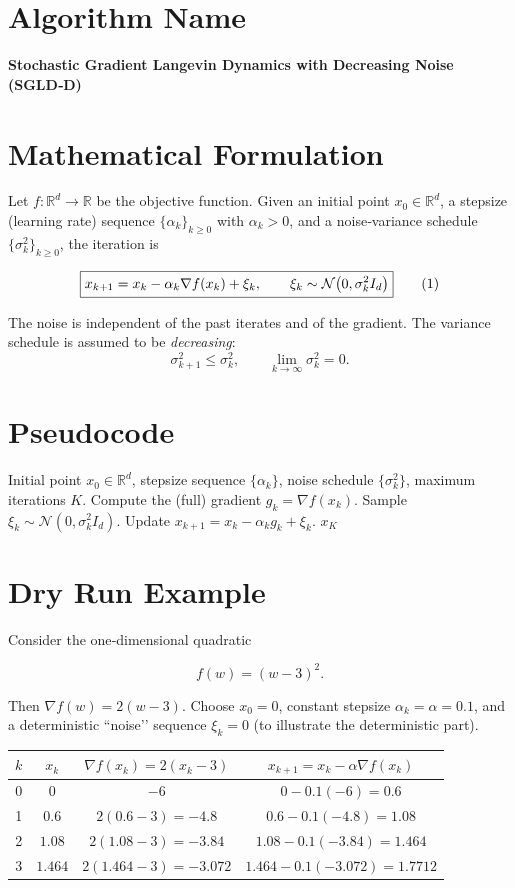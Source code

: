 \documentclass{article}
\newcommand{\R}{\mathbb{R}}
\begin{document}
\section*{Algorithm Name}
\textbf{Stochastic Gradient Langevin Dynamics with Decreasing Noise (SGLD‑D)}  

\section*{Mathematical Formulation}
Let $f:\R^d\rightarrow\R$ be the objective function.  
Given an initial point $x_0\in\R^d$, a stepsize (learning rate) sequence $\{\alpha_k\}_{k\ge0}$ with $\alpha_k>0$, and a noise‑variance schedule $\{\sigma_k^2\}_{k\ge0}$, the iteration is  

\[
\boxed{%
x_{k+1}=x_k-\alpha_k \nabla f(x_k)+\xi_k, \qquad 
\xi_k\sim\mathcal N\bigl(0,\sigma_k^{2} I_d\bigr)
}
\tag{1}
\]

The noise is independent of the past iterates and of the gradient.  
The variance schedule is assumed to be \emph{decreasing}:
\[
\sigma_{k+1}^2\le\sigma_k^2,\qquad \lim_{k\to\infty}\sigma_k^2=0.
\tag{2}
\]

\section*{Pseudocode}
\begin{algorithm}[H]
\caption{SGLD‑D}
\begin{algorithmic}[1]
\REQUIRE Initial point $x_0\in\R^d$, stepsize sequence $\{\alpha_k\}$, noise schedule $\{\sigma_k^2\}$, maximum iterations $K$.
    \STATE Compute the (full) gradient $g_k=\nabla f(x_k)$.
    \STATE Sample $\xi_k\sim\mathcal N(0,\sigma_k^2 I_d)$.
    \STATE Update $x_{k+1}=x_k-\alpha_k g_k+\xi_k$.
\ENDFOR
\RETURN $x_K$
\end{algorithmic}
\end{algorithm}

\section*{Dry Run Example}
Consider the one‑dimensional quadratic  

\[
f(w)=(w-3)^2 .
\]

Then $\nabla f(w)=2(w-3)$.  
Choose $x_0=0$, constant stepsize $\alpha_k=\alpha=0.1$, and a deterministic “noise’’ sequence $\xi_k=0$ (to illustrate the deterministic part).  

\begin{center}
\begin{tabular}{c|c|c|c}
$k$ & $x_k$ & $\nabla f(x_k)=2(x_k-3)$ & $x_{k+1}=x_k-\alpha\nabla f(x_k)$\\\hline
0 & $0$ & $-6$ & $0-0.1(-6)=0.6$\\
1 & $0.6$ & $2(0.6-3)=-4.8$ & $0.6-0.1(-4.8)=1.08$\\
2 & $1.08$ & $2(1.08-3)=-3.84$ & $1.08-0.1(-3.84)=1.464$\\
3 & $1.464$ & $2(1.464-3)=-3.072$ & $1.464-0.1(-3.072)=1.7712$
\end{tabular}
\end{center}
\end{document}
